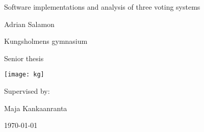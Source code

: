 \begin{titlepage}
	\centering
	\vspace{2cm}
	{\Huge Software implementations and analysis of three voting systems\par}
	\vspace{0.6cm}
	{\LARGE Adrian Salamon\par}
	\vspace{0.6cm}
	{\Large Kungsholmens gymnasium\par}
	\vspace{0.4cm}
	{\large Senior thesis\par}
	\vspace{0.6cm}
	\texttt{[image: kg]}\par\vspace{1cm}
	\vspace{4cm}
	\vfill
	Supervised by: \par
	Maja Kankaanranta

	\vfill

	{\large \today\par}
\end{titlepage}
